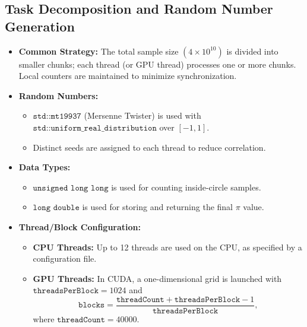 \documentclass[12pt]{article}
\begin{document}
\subsection{Task Decomposition and Random Number Generation}
\begin{itemize}
      \item \textbf{Common Strategy:} The total sample size \((4 \times 10^{10})\) is divided
            into smaller chunks; each thread (or GPU thread) processes one or more chunks.
            Local counters are maintained to minimize synchronization.
      \item \textbf{Random Numbers:}
            \begin{itemize}
                  \item \(\texttt{std::mt19937}\) (Mersenne Twister) is used with
                        \(\texttt{std::uniform\_real\_distribution}\) over \([-1,1]\).
                  \item Distinct seeds are assigned to each thread to reduce correlation.
            \end{itemize}
      \item \textbf{Data Types:}
            \begin{itemize}
                  \item \(\texttt{unsigned long long}\) is used for counting inside-circle samples.
                  \item \(\texttt{long double}\) is used for storing and returning the final
                        \(\pi\) value.
            \end{itemize}
      \item \textbf{Thread/Block Configuration:}
            \begin{itemize}
                  \item \textbf{CPU Threads:} Up to 12 threads are used on the CPU, as specified
                        by a configuration file.
                  \item \textbf{GPU Threads:} In CUDA, a one-dimensional grid is launched with
                        \(\texttt{threadsPerBlock} = 1024\) and
                        \[
                              \texttt{blocks}
                              = \frac{\texttt{threadCount} + \texttt{threadsPerBlock} - 1}{\texttt{threadsPerBlock}},
                        \]
                        where \(\texttt{threadCount} = 40000\).
            \end{itemize}
\end{itemize}
\end{document}
